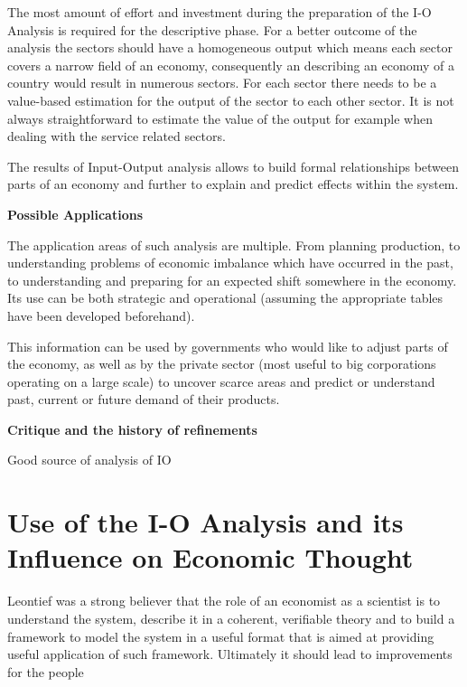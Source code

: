 \documentclass[12pt,a4paper]{scrartcl}
\begin{document}
	The most amount of effort and investment during the preparation of the I-O Analysis is required for the descriptive phase. For a better outcome of the analysis the sectors should have a homogeneous output which means each sector covers a narrow field of an economy, consequently an describing an economy of a country would result in numerous sectors. For each sector there needs to be a value-based estimation for the output of the sector to each other sector. It is not always straightforward to estimate the value of the output for example when dealing with the service related sectors.
	
	The results of Input-Output analysis allows to build formal relationships between parts of an economy and further to explain and predict effects within the system. \cite[]{InvestopediaIO} \cite[pp.137-138]{christ1955review}
	
	\textbf{Possible Applications}
	
	The application areas of such analysis are multiple. From planning production, to understanding problems of economic imbalance which have occurred in the past, to understanding and preparing for an expected shift somewhere in the economy. Its use can be both strategic and operational (assuming the appropriate tables have been developed beforehand).
	
	This information can be used by governments who would like to adjust parts of the economy, as well as by the private sector (most useful to big corporations operating on a large scale) to uncover scarce areas and predict or understand past, current or future demand of their products.
	
	\textbf{Critique and the history of refinements}
	
	Good source of analysis of IO \cite{christ1955review}
	
	\section{Use of the I-O Analysis and its Influence on Economic Thought}  \label{contribution}
	
	Leontief was a strong believer that the role of an economist as a scientist is to understand the system, describe it in a coherent, verifiable theory and to build a framework to model the system in a useful format that is aimed at providing useful application of such framework. Ultimately it should lead to improvements for the people 
	
\end{document}
